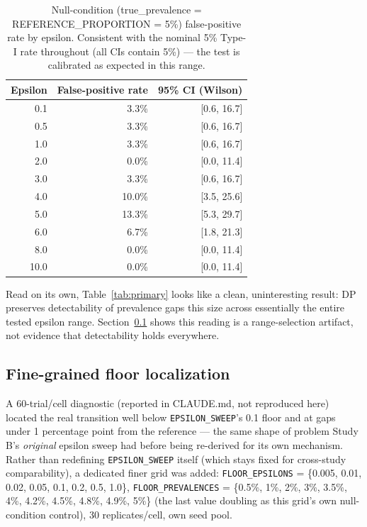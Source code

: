 \documentclass[11pt]{article}
\begin{document}
\begin{table}[H]
\centering
\begin{tabular}{rrr}
\toprule
Epsilon & False-positive rate & 95\% CI (Wilson) \\
\midrule
0.1  & 3.3\%  & [0.6, 16.7] \\
0.5  & 3.3\%  & [0.6, 16.7] \\
1.0  & 3.3\%  & [0.6, 16.7] \\
2.0  & 0.0\%  & [0.0, 11.4] \\
3.0  & 3.3\%  & [0.6, 16.7] \\
4.0  & 10.0\% & [3.5, 25.6] \\
5.0  & 13.3\% & [5.3, 29.7] \\
6.0  & 6.7\%  & [1.8, 21.3] \\
8.0  & 0.0\%  & [0.0, 11.4] \\
10.0 & 0.0\%  & [0.0, 11.4] \\
\bottomrule
\end{tabular}
\caption{Null-condition (true\_prevalence = REFERENCE\_PROPORTION = 5\%) false-positive rate by epsilon. Consistent with the nominal 5\% Type-I rate throughout (all CIs contain 5\%) --- the test is calibrated as expected in this range.}
\label{tab:primary-null}
\end{table}

Read on its own, Table~\ref{tab:primary} looks like a clean, uninteresting result: DP preserves detectability of prevalence gaps this size across essentially the entire tested epsilon range. Section~\ref{sec:floor} shows this reading is a range-selection artifact, not evidence that detectability holds everywhere.

\subsection{Fine-grained floor localization}
\label{sec:floor}

A 60-trial/cell diagnostic (reported in CLAUDE.md, not reproduced here) located the real transition well below \texttt{EPSILON\_SWEEP}'s 0.1 floor and at gaps under 1 percentage point from the reference --- the same shape of problem Study B's \emph{original} epsilon sweep had before being re-derived for its own mechanism. Rather than redefining \texttt{EPSILON\_SWEEP} itself (which stays fixed for cross-study comparability), a dedicated finer grid was added: \texttt{FLOOR\_EPSILONS} = \{0.005, 0.01, 0.02, 0.05, 0.1, 0.2, 0.5, 1.0\}, \texttt{FLOOR\_PREVALENCES} = \{0.5\%, 1\%, 2\%, 3\%, 3.5\%, 4\%, 4.2\%, 4.5\%, 4.8\%, 4.9\%, 5\%\} (the last value doubling as this grid's own null-condition control), 30 replicates/cell, own seed pool.
\end{document}
